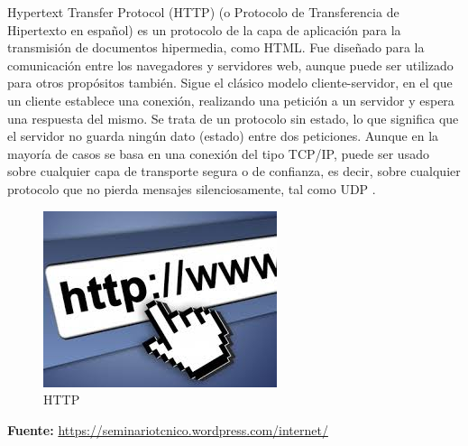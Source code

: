 		{Hypertext Transfer Protocol (HTTP) (o Protocolo de Transferencia de Hipertexto en español) es un protocolo de la capa de aplicación para la transmisión de documentos hipermedia, como HTML. Fue diseñado para la comunicación entre los navegadores y servidores web, aunque puede ser utilizado para otros propósitos también. Sigue el clásico modelo cliente-servidor, en el que un cliente establece una conexión, realizando una petición a un servidor y espera una respuesta del mismo. Se trata de un protocolo sin estado, lo que significa que el servidor no guarda ningún dato (estado) entre dos peticiones. Aunque en la mayoría de casos se basa en una conexión del tipo TCP/IP, puede ser usado sobre cualquier capa de transporte segura o de confianza, es decir, sobre cualquier protocolo que no pierda mensajes silenciosamente, tal como UDP \cite{http}.
		
		\begin{figure}[H]
			\centering
			\includegraphics[width=0.7\linewidth]{description/framework/http.jpg}
			\caption{HTTP}
		\end{figure}
		\begin{center}
			\textbf{Fuente:} \url{https://seminariotcnico.wordpress.com/internet/}
		\end{center}
		}
			
